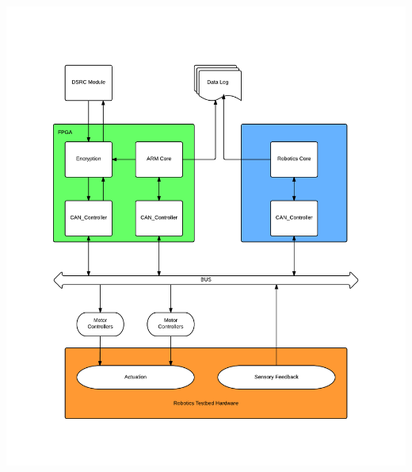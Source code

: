 \documentclass[paper=a4, fontsize=11pt]{scrartcl}
\numberwithin{equation}{section}		%
\numberwithin{figure}{section}			%
\numberwithin{table}{section}				%
\begin{document}
\begin{center}
	\includegraphics[width = \textwidth]{images/Bus_Layout}
\end{center}

\end{document}
